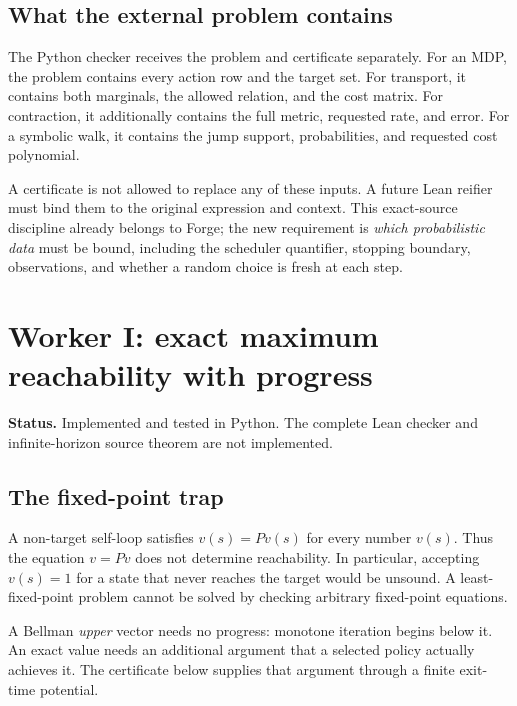 \documentclass[11pt,letterpaper]{article}
\theoremstyle{definition}\newtheorem{definition}[theorem]{Definition}
\theoremstyle{remark}\newtheorem{remark}[theorem]{Remark}
\newcommand{\status}[1]{\par\noindent\textbf{Status.} #1\par}
\begin{document}
\subsection{What the external problem contains}
The Python checker receives the problem and certificate separately. For an MDP, the problem contains every action row and the target set. For transport, it contains both marginals, the allowed relation, and the cost matrix. For contraction, it additionally contains the full metric, requested rate, and error. For a symbolic walk, it contains the jump support, probabilities, and requested cost polynomial.

A certificate is not allowed to replace any of these inputs. A future Lean reifier must bind them to the original expression and context. This exact-source discipline already belongs to Forge; the new requirement is \emph{which probabilistic data} must be bound, including the scheduler quantifier, stopping boundary, observations, and whether a random choice is fresh at each step.

\section{Worker I: exact maximum reachability with progress}
\status{Implemented and tested in Python. The complete Lean checker and infinite-horizon source theorem are not implemented.}
\subsection{The fixed-point trap}
A non-target self-loop satisfies $v(s)=P v(s)$ for every number $v(s)$. Thus the equation $v=Pv$ does not determine reachability. In particular, accepting $v(s)=1$ for a state that never reaches the target would be unsound. A least-fixed-point problem cannot be solved by checking arbitrary fixed-point equations.

A Bellman \emph{upper} vector needs no progress: monotone iteration begins below it. An exact value needs an additional argument that a selected policy actually achieves it. The certificate below supplies that argument through a finite exit-time potential.
\end{document}
